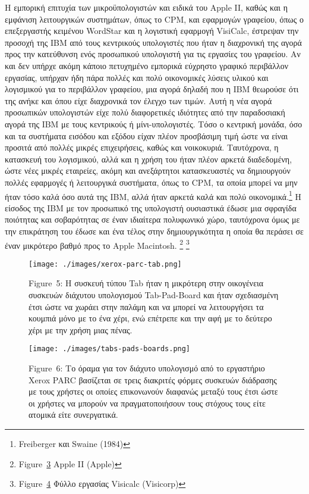 \documentclass[
]{article}
\begin{document}
Η εμπορική επιτυχία των μικροϋπολογιστών και ειδικά του Apple II, καθώς
και η εμφάνιση λειτουργικών συστημάτων, όπως το CPΜ, και εφαρμογών
γραφείου, όπως ο επεξεργαστής κειμένου WordStar και η λογιστική εφαρμογή
VisiCalc, έστρεψαν την προσοχή της IBM από τους κεντρικούς υπολογιστές
που ήταν η διαχρονική της αγορά προς την κατεύθυνση ενός προσωπικού
υπολογιστή για τις εργασίες του γραφείου. Αν και δεν υπήρχε ακόμη κάποιο
πετυχημένο εμπορικά εύχρηστο γραφικό περιβάλλον εργασίας, υπήρχαν ήδη
πάρα πολλές και πολύ οικονομικές λύσεις υλικού και λογισμικού για το
περιβάλλον γραφείου, μια αγορά δηλαδή που η IBM θεωρούσε ότι της ανήκε
και όπου είχε διαχρονικά τον έλεγχο των τιμών. Αυτή η νέα αγορά
προσωπικών υπολογιστών είχε πολύ διαφορετικές ιδιότητες από την
παραδοσιακή αγορά της IBM με τους κεντρικούς ή μίνι-υπολογιστές. Τόσο ο
κεντρική μονάδα, όσο και τα συστήματα εισόδου και εξόδου είχαν πλέον
προσβάσιμη τιμή ώστε να είναι προσιτά από πολλές μικρές επιχειρήσεις,
καθώς και νοικοκυριά. Ταυτόχρονα, η κατασκευή του λογισμικού, αλλά και η
χρήση του ήταν πλέον αρκετά διαδεδομένη, ώστε νέες μικρές εταιρείες,
ακόμη και ανεξάρτητοι κατασκευαστές να δημιουργούν πολλές εφαρμογές ή
λειτουργικά συστήματα, όπως το CPM, τα οποία μπορεί να μην ήταν τόσο
καλά όσο αυτά της IBM, αλλά ήταν αρκετά καλά και πολύ
οικονομικά.\footnote{Freiberger και Swaine (1984)} Η είσοδος της IBM με
τον προσωπικό της υπολογιστή ουσιαστικά έδωσε μια σφραγίδα ποιότητας και
σοβαρότητας σε έναν ιδιαίτερα πολυφωνικό χώρο, ταυτόχρονα όμως με την
επικράτηση του έδωσε και ένα τέλος στην δημιουργικότητα η οποία θα
περάσει σε έναν μικρότερο βαθμό προς το Apple Macintosh. \footnote{Figure~\protect\hyperlink{fig:apple2}{3}
  Apple II (Apple)} \footnote{Figure~\protect\hyperlink{fig:visicalc}{4}
  Φύλλο εργασίας Visicalc (Visicorp)}

\leavevmode{}%
\begin{figure}
\hypertarget{fig:xerox-parc-tab}{%
\centering
\texttt{[image: ./images/xerox-parc-tab.png]}
\caption{Figure~5: Η συσκευή τύπου Tab ήταν η μικρότερη στην οικογένεια
συσκευών διάχυτου υπολογισμού Tab-Pad-Board και ήταν σχεδιασμένη έτσι
ώστε να χωράει στην παλάμη και να μπορεί να λειτουργήσει τα κουμπιά μόνο
με το ένα χέρι, ενώ επέτρεπε και την αφή με το δεύτερο χέρι με την χρήση
μιας πένας.}\label{fig:xerox-parc-tab}
}
\end{figure}

\leavevmode{}%
\begin{figure}
\hypertarget{fig:tabs-pads-boards}{%
\centering
\texttt{[image: ./images/tabs-pads-boards.png]}
\caption{Figure~6: Το όραμα για τον διάχυτο υπολογισμό από το εργαστήριο
Xerox PARC βασίζεται σε τρεις διακριτές φόρμες συσκευών διάδρασης με
τους χρήστες οι οποίες επικονωνούν διαφανώς μεταξύ τους έτσι ώστε οι
χρήστες να μπορούν να πραγματοποιήσουν τους στόχους τους είτε ατομικά
είτε συνεργατικά.}\label{fig:tabs-pads-boards}
}
\end{figure}
\end{document}
